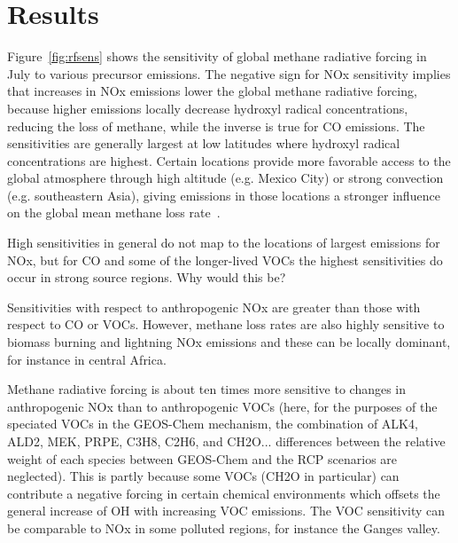 \section{Results}

Figure~\ref{fig:rfsens} shows the sensitivity of global methane radiative forcing in July to various precursor emissions. The negative sign for NOx sensitivity implies that increases in NOx emissions lower the global methane radiative forcing, because higher emissions locally decrease hydroxyl radical concentrations, reducing the loss of methane, while the inverse is true for CO emissions. The sensitivities are generally largest at low latitudes where hydroxyl radical concentrations are highest. Certain locations provide more favorable access to the global atmosphere through high altitude (e.g. Mexico City) or strong convection (e.g. southeastern Asia), giving emissions in those locations a stronger influence on the global mean methane loss rate~\citep{ref:bowman2012}.

High sensitivities in general do not map to the locations of largest emissions for NOx, but for CO and some of the longer-lived VOCs the highest sensitivities do occur in strong source regions. Why would this be?

Sensitivities with respect to anthropogenic NOx are greater than those with respect to CO or VOCs. However, methane loss rates are also highly sensitive to biomass burning and lightning NOx emissions and these can be locally dominant, for instance in central Africa.

Methane radiative forcing is about ten times more sensitive to changes in anthropogenic NOx than to anthropogenic VOCs (here, for the purposes of the speciated VOCs in the GEOS-Chem mechanism, the combination of ALK4, ALD2, MEK, PRPE, C3H8, C2H6, and CH2O... differences between the relative weight of each species between GEOS-Chem and the RCP scenarios are neglected). This is partly because some VOCs (CH2O in particular) can contribute a negative forcing in certain chemical environments which offsets the general increase of OH with increasing VOC emissions. The VOC sensitivity can be comparable to NOx in some polluted regions, for instance the Ganges valley.

